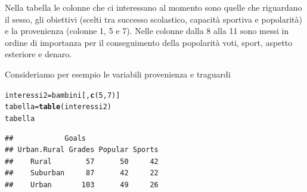 \documentclass[onecolumn,12pt]{book}\usepackage[]{graphicx}\usepackage[]{color}
\makeatletter
\newcommand{\hlnum}[1]{\textcolor[rgb]{0.686,0.059,0.569}{#1}}%
\newcommand{\hlstd}[1]{\textcolor[rgb]{0.345,0.345,0.345}{#1}}%
\newcommand{\hlkwb}[1]{\textcolor[rgb]{0.69,0.353,0.396}{#1}}%
\newcommand{\hlkwd}[1]{\textcolor[rgb]{0.737,0.353,0.396}{\textbf{#1}}}%
\newenvironment{kframe}{%
 \def\at@end@of@kframe{}%
 \ifinner\ifhmode%
  \def\at@end@of@kframe{\end{minipage}}%
  \begin{minipage}{\columnwidth}%
 \fi\fi%
 \def\FrameCommand##1{\hskip\@totalleftmargin \hskip-\fboxsep
 \colorbox{shadecolor}{##1}\hskip-\fboxsep
     \hskip-\linewidth \hskip-\@totalleftmargin \hskip\columnwidth}%
 \MakeFramed {\advance\hsize-\width
   \@totalleftmargin\z@ \linewidth\hsize
   \@setminipage}}%
 {\par\unskip\endMakeFramed%
 \at@end@of@kframe}
\newenvironment{knitrout}{}{} %
\makeatother
\begin{document}
Nella tabella le colonne che ci interessano al momento sono quelle che riguardano il sesso, gli obiettivi (scelti tra successo scolastico, capacit\`a sportiva e popolarit\`a) e la provenienza (colonne 1, 5  e 7). Nelle colonne dalla 8 alla 11 sono messi in ordine di importanza per il conseguimento della popolarit\`a  voti, sport, aspetto esteriore e denaro.
 
Consideriamo per esempio le variabili provenienza e traguardi
\begin{knitrout}
\color{fgcolor}\begin{kframe}
\begin{alltt}
\hlstd{interessi2}\hlkwb{=}\hlstd{bambini[,}\hlkwd{c}\hlstd{(}\hlnum{5}\hlstd{,}\hlnum{7}\hlstd{)]}
\hlstd{tabella}\hlkwb{=}\hlkwd{table}\hlstd{(interessi2)}
\hlstd{tabella}
\end{alltt}
\begin{verbatim}
##            Goals
## Urban.Rural Grades Popular Sports
##    Rural        57      50     42
##    Suburban     87      42     22
##    Urban       103      49     26
\end{verbatim}
\end{kframe}
\end{knitrout}
 
\end{document}
